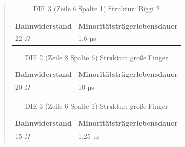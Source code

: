 \begin{quote}
     \vspace{2em}
	

      		\begin{table}[H]
     		  \begin{addmargin}[3cm]{3cm}
     			\centering
                   \begin{tabular}{|p{5cm}|p{5cm}|}
         			\hline
         			Bahnwiderstand &  Minoritätsträgerlebensdauer\\
         			\hline
        			22 $\Omega$ & 1.6 µs \\
        			\hline

                    \end{tabular}
              \end{addmargin}
              \caption{DIE 3 (Zeile 6 Spalte 1) Struktur: Biggi 2}
              \label{tab:bahnMinbigauss}
            \end{table}

     \vspace{2em}

      		\begin{table}[H]
     		  \begin{addmargin}[3cm]{3cm}
     			\centering
                   \begin{tabular}{|p{5cm}|p{5cm}|}
         			\hline
         			Bahnwiderstand &  Minoritätsträgerlebensdauer\\
         			\hline
        			20 $\Omega$ & 10 µs \\
        			\hline

                    \end{tabular}
              \end{addmargin}
              \caption{DIE 2 (Zeile 8 Spalte 6) Struktur: große Finger}
              \label{tab:bahnMinfingmitt}
            \end{table}

     \vspace{2em}
    
      		\begin{table}[H]
     		  \begin{addmargin}[3cm]{3cm}
     			\centering
                   \begin{tabular}{|p{5cm}|p{5cm}|}
         			\hline
         			Bahnwiderstand &  Minoritätsträgerlebensdauer\\
         			\hline
        			15  $\Omega$ & 1,25 µs \\
        			\hline

                    \end{tabular}
              \end{addmargin}
              \caption{DIE 3 (Zeile 6 Spalte 1) Struktur: große Finger}
              \label{tab:bahnMinfingaus}
            \end{table}


\end{quote}
